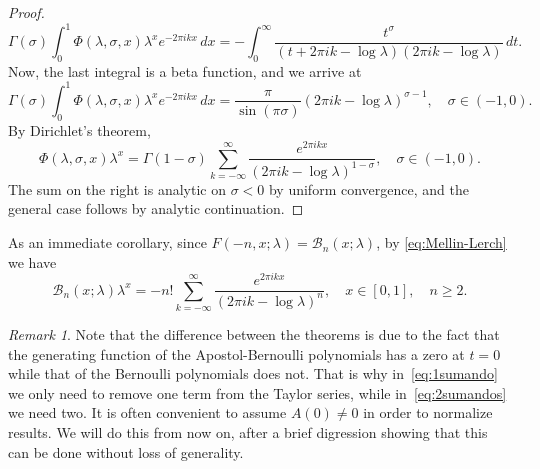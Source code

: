 \documentclass[11pt,a4paper]{amsart}
\newcommand{\AB}{\mathcal{B}}
\theoremstyle{plain}
\theoremstyle{plain}
\theoremstyle{plain}
\theoremstyle{remark}
\newtheorem*{remark}{Remark}
\begin{document}
\begin{proof}
\[
  \Gamma(\sigma) \int_0^1 \Phi(\lambda,\sigma,x) \lambda^x e^{-2\pi i kx} \,dx
  = -\int_0^\infty \frac{t^\sigma}{(t+2\pi i k-\log\lambda)(2\pi i k -\log\lambda)}\,dt.
\]
Now, the last integral is a beta function, and we arrive at
\[
  \Gamma(\sigma) \int_0^1 \Phi(\lambda,\sigma,x) \lambda^x e^{-2\pi i kx}\, dx
  = \frac{\pi}{\sin(\pi \sigma)} (2\pi i k -\log\lambda)^{\sigma-1},
\quad \sigma\in (-1,0).
\]
By Dirichlet's theorem,
\begin{equation*}
  \Phi(\lambda,\sigma,x)\lambda^x
  = \Gamma(1-\sigma)\sum_{k=-\infty}^\infty \frac{e^{2\pi ikx}}{(2\pi i k -\log\lambda)^{1-\sigma}},
  \quad \sigma\in (-1,0).
\end{equation*}
The sum on the right is analytic on $\sigma<0$ by uniform convergence, and the general case follows by analytic continuation.
\end{proof}

As an immediate corollary, since $F(-n,x;\lambda) = \AB_n(x;\lambda)$, by \eqref{eq:Mellin-Lerch} we have
\begin{equation}
\label{eq:SFApostol-Ber}
\AB_n(x;\lambda)\lambda^x
= -n!\sum_{k=-\infty}^\infty \frac{e^{2\pi ikx}}{(2\pi i k -\log\lambda)^{n}},
\quad x\in [0,1], \quad n\geq 2.
\end{equation}



\begin{remark}
Note that the difference between the theorems is due to the fact that the generating function of the Apostol-Bernoulli polynomials has a zero at $t = 0$ while that of the Bernoulli polynomials does not. That is why in~\eqref{eq:1sumando} we only need to remove one term from the Taylor series, while in~\eqref{eq:2sumandos} we need two. It is often convenient to assume $A(0) \neq 0$ in order to normalize results. We will do this from now on, after a brief digression showing that this can be done without loss of generality.
\end{remark}
\end{document}
